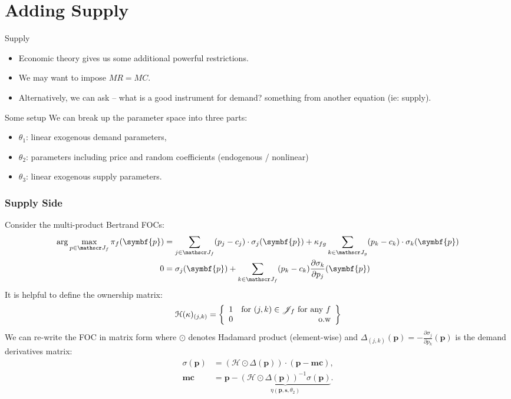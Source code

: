 \documentclass[aspectratio=169,10pt]{beamer}
\begin{document}
\section{Adding Supply}
\begin{frame}{Supply}
\begin{itemize}
\item Economic theory gives us some additional powerful restrictions.
\item We may want to impose $MR = MC$.
\item Alternatively, we can ask -- what is a good instrument for demand? \alert{something from another equation} (ie: supply).
\end{itemize}
\end{frame}

\begin{frame}{Some setup}
We can break up the parameter space into three parts:
\begin{itemize}
\item $\theta_1$: linear exogenous demand parameters, 
 \item $\theta_2$: parameters including price and random coefficients (endogenous / nonlinear)
 \item $\theta_3$: linear exogenous supply parameters.
\end{itemize}
\end{frame}



\begin{frame}[plain]
\frametitle{Supply Side}
Consider the multi-product Bertrand FOCs:
{\footnotesize \begin{align*}
\arg \max_{p \in \calJ_f} \pi_f (\symbf{p}) &= \sum_{j \in \calJ_f} (p_j - c_j) \cdot \sigma_j(\symbf{p}) +  \kappa_{fg}\sum_{k \in \calJ_g} (p_k - c_k) \cdot \sigma_k(\symbf{p}) \\
0&= \sigma_j(\symbf{p}) + \sum_{k \in \calJ_f} (p_k - c_k) \frac{\partial \sigma_{k}}{\partial p_j}(\symbf{p}) 
\end{align*}
}
It is helpful to define the \alert{ownership matrix}:
\begin{align*}
\mathcal{H}(\kappa)_{(j,k)} = \left\{\begin{array}{lr}
          1 & \text{for }  (j,k) \in \mathscr{J}_f \text{ for any } f \\ 
      0 & \text{o.w}\\
        \end{array} \right\}
\end{align*}
We can re-write the FOC in matrix form where $\odot$ denotes Hadamard product (element-wise) and  $\Delta_{(j,k)}(\symbf{p})  = - \frac{\partial \sigma_{j}}{\partial p_k}(\symbf{p})$ is the demand derivatives matrix:
\begin{align*}
        \sigma(\symbf{p}) &= (\mathcal{H} \odot \Delta(\symbf{p})) \cdot (\symbf{p} - \symbf{mc}), \\
       \symbf{mc} &=  \symbf{p} - \underbrace{(\mathcal{H} \odot \Delta(\symbf{p}))^{-1} \sigma(\symbf{p})}_{\eta(\symbf{p},\symbf{s},\theta_2)}.
\end{align*}
\end{frame}
\end{document}
